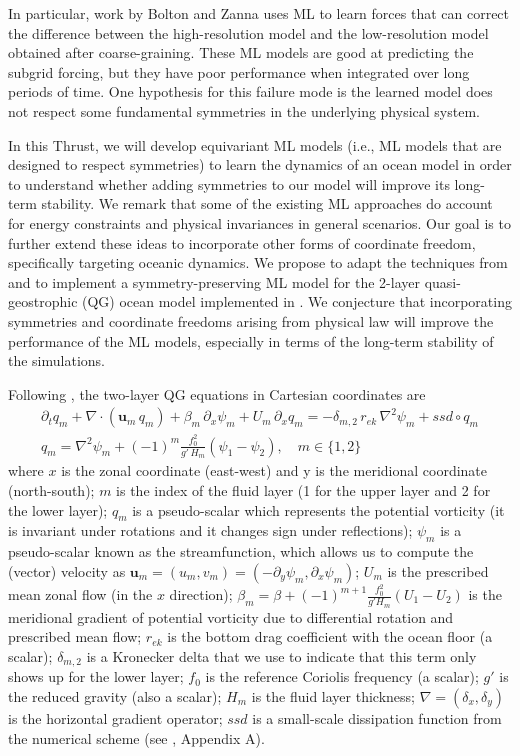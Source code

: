 \documentclass[11pt]{article}
\begin{document}
In particular, work by Bolton and Zanna \cite{Bolton2019} uses ML to learn forces that can correct the difference between the high-resolution model and the low-resolution model obtained after coarse-graining. These ML models are good at predicting the subgrid forcing, but they have poor performance when integrated over long periods of time. One hypothesis for this failure mode is the learned model does not respect some fundamental symmetries in the underlying physical system.

In this Thrust, we will develop equivariant ML models (i.e., ML models that are designed to respect symmetries) to learn the dynamics of an ocean model in order to understand whether adding symmetries to our model will improve its long-term stability.
We remark that some of the existing ML approaches do account for energy constraints \cite{guan2023learning} and physical invariances \cite{frezat2021physical, guan2023learning, pawar2023frame, Bolton2019} in general scenarios. Our goal is to further extend these ideas to incorporate other forms of coordinate freedom, specifically targeting oceanic dynamics. We propose to adapt the techniques from \cite{villar2021scalars} and \cite{xu2022pde} to implement a symmetry-preserving ML model for the 2-layer quasi-geostrophic (QG) ocean model implemented in \cite{pyqg}. We conjecture that incorporating symmetries and coordinate freedoms arising from physical law will improve the performance of the ML models, especially in terms of the long-term stability of the simulations.

Following \cite{pyqg}, the two-layer QG equations in Cartesian coordinates are
\begin{align} \label{eq.QG1}
    \partial_t q_m + \nabla\cdot (\mathbf u_m \,q_m) + \beta_m\, \partial_x \psi_m + U_m\,\partial_x q_m = -\delta_{m,2}\,r_{ek}\,\nabla^2\psi_m +ssd\circ q_m \\
    q_m = \nabla^2\psi_m+(-1)^m\frac{f_0^2}{g'\,H_m}(\psi_1-\psi_2), \quad m\in\{1,2\}
    \label{eq.QG2}
\end{align}
where $x$ is the zonal coordinate (east-west) and y is the meridional coordinate (north-south); $m$ is the index of the fluid layer (1 for the upper layer and 2 for the lower layer); $q_m$ is a pseudo-scalar which represents the potential vorticity (it is invariant under rotations and it changes sign under reflections); $\psi_m$ is a pseudo-scalar known as the streamfunction, which allows us to compute the (vector) velocity as 
$\mathbf u_m=(u_m, v_m) = (-\partial_y\psi_m, \partial_x \psi_m)$; $U_m$ is the prescribed mean zonal flow (in the $x$ direction); $\beta_m = \beta + (-1)^{m+1} \frac{f_0^2}{g'H_m}(U_1-U_2)$ is the meridional gradient of potential vorticity due to differential rotation and prescribed mean flow; $r_{ek}$ is the bottom drag coefficient with the ocean floor (a scalar); $\delta_{m,2}$ is a Kronecker delta that we use to indicate that this term only shows up for the lower layer; $f_0$ is the reference Coriolis frequency (a scalar); $g'$ is the reduced gravity (also a scalar); $H_m$ is the fluid layer thickness; $\nabla = (\delta_x, \delta_y)$ is the horizontal gradient operator; $ssd$ is a small-scale dissipation function from the numerical scheme (see \cite{perezhogin2023generative}, Appendix A). 
\end{document}
